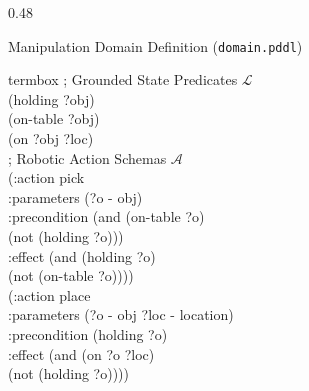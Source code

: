 \documentclass[10pt]{beamer}
\begin{document}
\begin{frame}[t]
\begin{columns}[T]
    \begin{column}{0.48\textwidth}
        \begin{block}{Manipulation Domain Definition (\texttt{domain.pddl})}
            \begin{beamercolorbox}[sep=4pt,rounded=true,shadow=true,wd=\linewidth]{termbox}
                \ttfamily\tiny
                ; Grounded State Predicates $\mathcal{L}$\\
                (holding ?obj)\\
                (on-table ?obj)\\
                (on ?obj ?loc)\\[0.15cm]
                ; Robotic Action Schemas $\mathcal{A}$\\
                (:action pick\\
                \hspace{2mm} :parameters (?o - obj)\\
                \hspace{2mm} :precondition (and (on-table ?o)\\
                \hspace{14mm} (not (holding ?o)))\\
                \hspace{2mm} :effect (and (holding ?o)\\
                \hspace{10mm} (not (on-table ?o))))\\[0.15cm]
                (:action place\\
                \hspace{2mm} :parameters (?o - obj ?loc - location)\\
                \hspace{2mm} :precondition (holding ?o)\\
                \hspace{2mm} :effect (and (on ?o ?loc)\\
                \hspace{10mm} (not (holding ?o))))
            \end{beamercolorbox}
        \end{block}
    \end{column}
\end{columns}
\end{frame}
\end{document}
